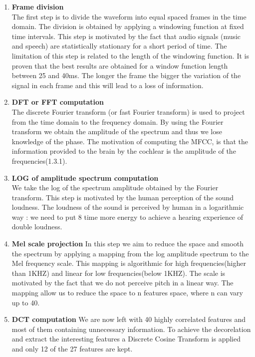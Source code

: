 \documentclass[hidelinks,12pt]{report}
\begin{document}
\begin{enumerate}
\item \textbf{Frame division} \\
The first step is to divide the waveform into equal spaced frames in the time domain. The division is obtained by applying a windowing function at fixed time intervals. This step is motivated by the fact that audio signals (music and speech) are statistically stationary for a short period of time. The limitation of this step is related to the length of the windowing function. It is proven that the best results are obtained for a window function length between 25 and 40ms. The longer the frame the bigger the variation of the signal in each frame and this will lead to a loss of information. 

\item \textbf{DFT or FFT computation\\}
The discrete Fourier transform (or fast Fourier transform) is used to project from the time domain to the frequency domain. By using the Fourier transform we obtain the amplitude of the spectrum and thus we lose knowledge of the phase. The motivation of computing the MFCC, is that the information provided to the brain by the cochlear is the amplitude of the frequencies(1.3.1).
\item \textbf{LOG of amplitude spectrum computation}\\
We take the log of the spectrum amplitude obtained by the Fourier transform. This step is motivated by the human perception of the sound loudness. The loudness of the sound is perceived by human in a logarithmic way : we need to put 8 time more energy to achieve a hearing experience of double loudness. 
\item \textbf{Mel scale projection}
In this step we aim to reduce the space and smooth the spectrum by applying a mapping from the log amplitude spectrum to the Mel frequency scale. This mapping is algorithmic for high frequencies(higher than 1KHZ) and linear for low frequencies(below 1KHZ). The scale is motivated by the fact that we do not perceive pitch in a linear way. The mapping allow us to reduce the space to n features space, where n can vary up to 40.
\item \textbf{DCT computation}
We are now left with 40 highly correlated features and most of them containing unnecessary information. To achieve the decorelation and extract the interesting features a Discrete Cosine Transform is applied and only 12 of the 27 features are kept.
\end{enumerate}
\end{document}
